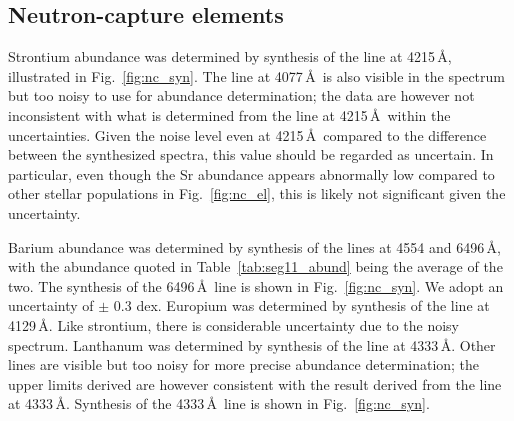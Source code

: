 \documentclass{emulateapj}
\begin{document}
\subsection{Neutron-capture elements}

Strontium abundance was determined by synthesis of the line at 4215\,\AA, illustrated in Fig.~\ref{fig:nc_syn}. The line at 4077\,\AA\, is also visible in the spectrum but too noisy to use for abundance determination; the data are however not inconsistent with what is determined from the line at 4215\,\AA\, within the uncertainties. Given the noise level even at 4215\,\AA\, compared to the difference between the synthesized spectra, this value should be regarded as uncertain. In particular, even though the Sr abundance appears abnormally low compared to other stellar populations in Fig.~\ref{fig:nc_el}, this is likely not significant given the uncertainty.

Barium abundance was determined by synthesis of the lines at 4554 and 6496\,\AA, with the abundance quoted in Table~\ref{tab:seg11_abund} being the average of the two. The synthesis of the 6496\,\AA\,  line is shown in Fig.~\ref{fig:nc_syn}. We adopt an uncertainty of $\pm$ 0.3 dex. Europium was determined by synthesis of the line at 4129\,\AA. Like strontium, there is considerable uncertainty due to the noisy spectrum. Lanthanum was determined by synthesis of the line at 4333\,\AA. Other lines are visible but too noisy for more precise abundance determination; the upper limits derived are however consistent with the result derived from the line at 4333\,\AA. Synthesis of the 4333\,\AA\, line is shown in Fig.~\ref{fig:nc_syn}. 
\end{document}
